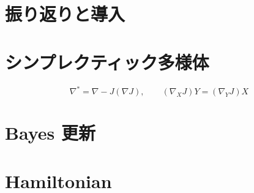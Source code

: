 \documentclass[report]{jlreq}
\begin{document}
%

%
\section*{振り返りと導入}

%
\section{シンプレクティック多様体}


\begin{definition}[シンプレクティック多様体]
    \TODO{}
\end{definition}

\begin{example}[双対平坦空間]
    \TODO{}
\end{example}

\begin{theorem}[統計構造との両立]
    \begin{equation}
        \nabla^* = \nabla - J(\nabla J),
            \qquad
            (\nabla_X J) Y = (\nabla_Y J) X
    \end{equation}
\end{theorem}

%
\section{Bayes 更新}

\begin{proposition}
    \TODO{}
\end{proposition}

%
\section{Hamiltonian}
\end{document}
